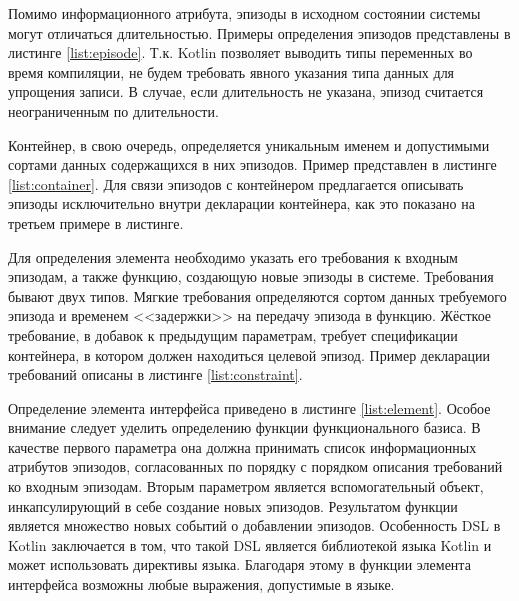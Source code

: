 Помимо информационного атрибута, эпизоды в исходном состоянии системы могут отличаться длительностью. Примеры определения эпизодов представлены в листинге \ref{list:episode}. 
Т.к. Kotlin позволяет выводить типы переменных во время компиляции, не будем требовать явного указания типа данных для упрощения записи.
В случае, если длительность не указана, эпизод считается неограниченным по длительности.



Контейнер, в свою очередь, определяется уникальным именем и допустимыми сортами данных содержащихся в них эпизодов. Пример представлен в листинге \ref{list:container}. 
Для связи эпизодов с контейнером предлагается описывать эпизоды исключительно внутри декларации контейнера, как это показано на третьем примере в листинге.



Для определения элемента необходимо указать его требования к входным эпизодам, а также функцию, создающую новые эпизоды в системе.
Требования бывают двух типов. Мягкие требования определяются сортом данных требуемого эпизода и временем <<задержки>> на передачу эпизода в функцию. 
Жёсткое требование, в добавок к предыдущим параметрам, требует спецификации контейнера, в котором должен находиться целевой эпизод. Пример декларации требований описаны в листинге \ref{list:constraint}.



Определение элемента интерфейса приведено в листинге \ref{list:element}. 
Особое внимание следует уделить определению функции функционального базиса.
В качестве первого параметра она должна принимать список информационных атрибутов эпизодов, согласованных по порядку с порядком описания требований ко входным эпизодам.
Вторым параметром является вспомогательный объект, инкапсулирующий в себе создание новых эпизодов.
Результатом функции является множество новых событий о добавлении эпизодов.
Особенность DSL в Kotlin заключается в том, что такой DSL является библиотекой языка Kotlin и может использовать директивы языка. 
Благодаря этому в функции элемента интерфейса возможны любые выражения, допустимые в языке.

